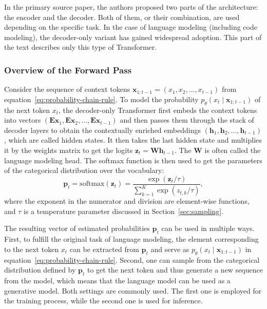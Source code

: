 In the primary source paper, the authors proposed two parts of the architecture: the encoder and the decoder. Both of them, or their combination, are used depending on the specific task. In the case of language modeling (including code modeling), the decoder-only variant has gained widespread adoption. This part of the text describes only this type of Transformer.

\subsubsection*{Overview of the Forward Pass}

Consider the sequence of context tokens \(\bm{x}_{1:t-1} = (x_1, x_2, \ldots, x_{t-1})\) from equation~\ref{eq:probability-chain-rule}. To model the probability \(p_{\theta}(x_t \mid \bm{x}_{1:t-1})\) of the next token \(x_t\), the decoder-only Transformer first embeds the context tokens into vectors \((\mathbf{Ex}_1, \mathbf{Ex}_2, \ldots, \mathbf{Ex}_{t-1})\) and then passes them through the stack of decoder layers to obtain the contextually enriched embeddings \((\mathbf{h}_1, \mathbf{h}_2, \ldots, \mathbf{h}_{t-1})\), which are called hidden states. It then takes the last hidden state and multiplies it by the weights matrix to get the logits \(\mathbf{z}_t = \mathbf{Wh}_{t-1}\). The \(\mathbf{W}\) is often called the language modeling head. The softmax function is then used to get the parameters of the categorical distribution over the vocabulary:
\begin{equation}\label{eq:softmax}
    \mathbf{p}_t = \mathrm{softmax}(\mathbf{z}_t) = \frac{\exp(\mathbf{z}_t / \tau)}{\sum_{k=1}^{K} \exp(z_{t,k} / \tau)},
\end{equation}
where the exponent in the numerator and division are element-wise functions, and \(\tau\) is a temperature parameter discussed in Section~\ref{sec:sampling}.

The resulting vector of estimated probabilities \(\mathbf{p}_t\) can be used in multiple ways. First, to fulfill the original task of language modeling, the element corresponding to the next token \(x_t\) can be extracted from \(\mathbf{p}_t\) and serve as \(p_{\theta}(x_t \mid \bm{x}_{1:t-1})\) in equation~\ref{eq:probability-chain-rule}. Second, one can sample from the categorical distribution defined by \(\mathbf{p}_t\) to get the next token and thus generate a new sequence from the model, which means that the language model can be used as a generative model. Both settings are commonly used. The first one is employed for the training process, while the second one is used for inference.

